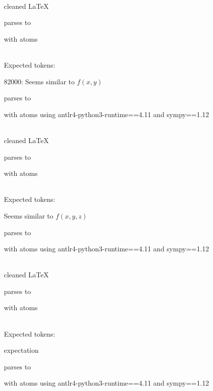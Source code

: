\documentclass{article}
\begin{document}
\ \\
cleaned \LaTeX

parses to

with atoms


\ \\
Expected tokens:


\hrulefill

82000:
Seems similar to $f(x, y)$

parses to

with atoms
using antlr4-python3-runtime==4.11 and sympy==1.12

\ \\
cleaned \LaTeX

parses to

with atoms


\ \\
Expected tokens:




\hrulefill

Seems similar to $f(x, y, z)$

parses to

with atoms
using antlr4-python3-runtime==4.11 and sympy==1.12

\ \\
cleaned \LaTeX

parses to

with atoms


\ \\
Expected tokens:




\hrulefill


expectation

parses to

with atoms
using antlr4-python3-runtime==4.11 and sympy==1.12
\end{document}
